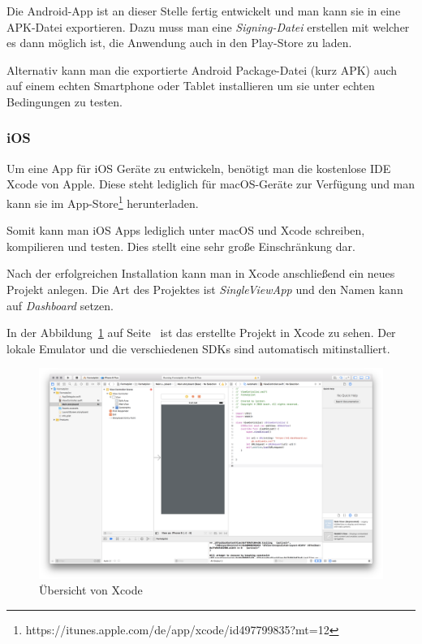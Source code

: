 Die Android-App ist an dieser Stelle fertig entwickelt und man kann sie in eine APK-Datei exportieren. Dazu muss man
eine \textit{Signing-Datei} erstellen mit welcher es dann möglich ist, die Anwendung auch in den Play-Store zu laden.

Alternativ kann man die exportierte Android Package-Datei (kurz APK) auch auf einem echten Smartphone oder Tablet
installieren um sie unter echten Bedingungen zu testen.

\subsubsection{iOS}
Um eine App für iOS Geräte zu entwickeln, benötigt man die kostenlose IDE Xcode von Apple. Diese steht lediglich für
macOS-Geräte zur Verfügung und man kann sie im App-Store\footnote{https://itunes.apple.com/de/app/xcode/id497799835?mt=12}
herunterladen.

Somit kann man iOS Apps lediglich unter macOS und Xcode schreiben, kompilieren und testen. Dies stellt eine sehr große
Einschränkung dar.

Nach der erfolgreichen Installation kann man in Xcode anschließend ein neues Projekt anlegen. Die Art des Projektes ist
\textit{SingleViewApp} und den Namen kann auf \textit{Dashboard} setzen.

In der Abbildung~\ref{fig:umsetzung_ios_ide} auf Seite~\pageref{fig:umsetzung_ios_ide} ist das erstellte Projekt in
Xcode zu sehen. Der lokale Emulator und die verschiedenen SDKs sind automatisch mitinstalliert.

\begin{figure}[h]
    \centering
    \includegraphics[width=\textwidth]{images/kapitel_4/ios_ide.png}
    \caption{Übersicht von Xcode}
    \label{fig:umsetzung_ios_ide}
\end{figure}

